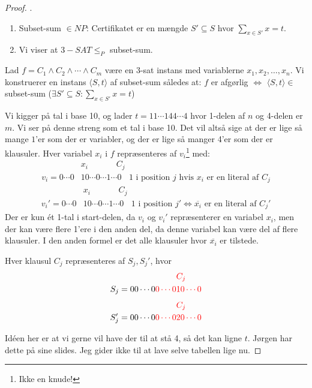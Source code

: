 \begin{proof}
.
  \begin{enumerate}
    \item Subset-sum $\in NP$: Certifikatet er en mængde $S' \subseteq S$ hvor $\sum_{x \in S'}x= t$.
          \item Vi viser at $3-SAT \le_{P}$ subset-sum.
  \end{enumerate}
  Lad $f = C_{1} \land C_{2} \land \cdots \land C_{m}$ være en 3-sat instans med variablerne $x_{1}, x_{2}, \ldots, x_{n}$. Vi konstruerer en instans $\langle S, t\rangle$ af subset-sum således at: $f$ er afgørlig $\iff$ $\langle S,t \rangle \in $ subset-sum ($\exists S' \subseteq S : \sum_{x \in S'}x=t$)

  Vi kigger på tal i base 10, og lader $t = 11 \cdots 144 \cdots 4$ hvor 1-delen af $n$ og 4-delen er $m$. Vi ser på denne streng som et tal i base 10. Det vil altså sige at der er lige så mange $1$'er som der er variabler, og der er lige så manger 4'er som der er klausuler. Hver variabel $x_{i}$ i $f$ repræsenteres af $v_{i}$\footnote{Ikke en knude!} med:
  \begin{align*}
&x_{i}\;\;\;\;\;\;\;\;\;\;\;\;C_{j}\\
v_{i} = 0 \cdots 0&10 \cdots 0 \cdots 1 \cdots 0 \;\; \text{ 1 i position }j \text{ hvis } x_{i} \text{ er en literal af } C_{j}
  \end{align*}
  \begin{align*}
&x_{i}\;\;\;\;\;\;\;\;\;\;\;\;C_{j}\\
v_{i}' = 0 \cdots 0&10 \cdots 0 \cdots 1 \cdots 0 \;\; \text{ 1 i position }j' \iff \overline{x_{i}} \text{ er en literal af } C_{j}'
  \end{align*}
  Der er kun ét 1-tal i start-delen, da $v_{i}$ og $v_{i}'$ repræsenterer en variabel $x_{i}$, men der kan være flere 1'ere i den anden del, da denne variabel kan være del af flere klausuler. I den anden formel er det alle klausuler hvor $\overline{x_{i}}$ er tilstede.

  Hver klausul $C_{j}$ repræsenteres af $S_{j}, S_{j}'$, hvor
  \begin{align*}
    &{\color{red}C_{j}}\\
 S_{j} = {00 \cdots 0 } {\color{red}0 \cdots 0}&{\color{red}10 \cdots 0}
  \end{align*}
  \begin{align*}
    &{\color{red}C_{j}}\\
 S_{j}' = {00 \cdots 0 } {\color{red}0 \cdots 0}&{\color{red}20 \cdots 0}
  \end{align*}

  Idéen her er at vi gerne vil have der til at stå 4, så det kan ligne $t$. Jørgen har dette på sine slides. Jeg gider ikke til at lave selve tabellen lige nu.
\end{proof}

